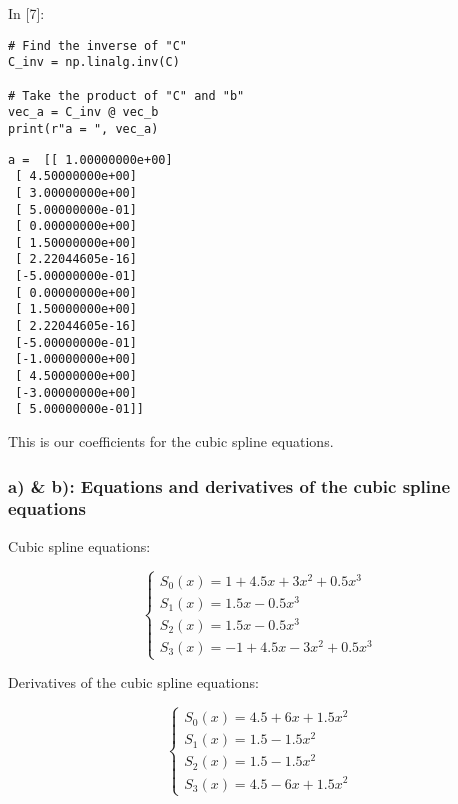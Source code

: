 \documentclass[11pt]{article}
\newif\ifcode
\newif\ifleftmargins
\newlength{\promptlength}
\newcommand{\prompt}[3]{
        \needspace{1.1cm}
        \settowidth{\promptlength}{ #1 [#3] }
        \ifleftmargins\hspace{-\promptlength}\hspace{-5pt}\fi
        {\color{#2}#1 [#3]:}
        \ifleftmargins\vspace{-2.7ex}\fi
    }
\begin{document}
    
\prompt{In}{incolor}{7}
\codetrue
\begin{tcolorbox}[breakable, size=fbox, boxrule=1pt, pad at break*=1mm, colback=cellbackground, colframe=cellborder]
\begin{verbatim}
# Find the inverse of "C"
C_inv = np.linalg.inv(C)

# Take the product of "C" and "b"
vec_a = C_inv @ vec_b
print(r"a = ", vec_a)
\end{verbatim}
\end{tcolorbox}
\codefalse

    \begin{Verbatim}[commandchars=\\\{\}]
a =  [[ 1.00000000e+00]
 [ 4.50000000e+00]
 [ 3.00000000e+00]
 [ 5.00000000e-01]
 [ 0.00000000e+00]
 [ 1.50000000e+00]
 [ 2.22044605e-16]
 [-5.00000000e-01]
 [ 0.00000000e+00]
 [ 1.50000000e+00]
 [ 2.22044605e-16]
 [-5.00000000e-01]
 [-1.00000000e+00]
 [ 4.50000000e+00]
 [-3.00000000e+00]
 [ 5.00000000e-01]]

    \end{Verbatim}

    This is our coefficients for the cubic spline equations.

    \hypertarget{a-b-equations-and-derivatives-of-the-cubic-spline-equations}{%
\subsubsection{a) \& b): Equations and derivatives of the cubic spline
equations}\label{a-b-equations-and-derivatives-of-the-cubic-spline-equations}}

Cubic spline equations:

\[\left\{ \begin{array}{ll}
            S_0(x) = 1 + 4.5 x + 3 x^2 + 0.5 x^3 \\
            S_1(x) = 1.5 x - 0.5 x^3 \\
            S_2(x) = 1.5 x - 0.5 x^3 \\
            S_3(x) = -1 + 4.5 x - 3 x^2 + 0.5 x^3
            \end{array} \right.\]

    Derivatives of the cubic spline equations:

\[\left\{ \begin{array}{ll}
            S_0(x) = 4.5 + 6 x + 1.5 x^2 \\
            S_1(x) = 1.5 - 1.5 x^2 \\
            S_2(x) = 1.5 - 1.5 x^2 \\
            S_3(x) = 4.5 - 6 x + 1.5 x^2
            \end{array} \right.\]
\end{document}
